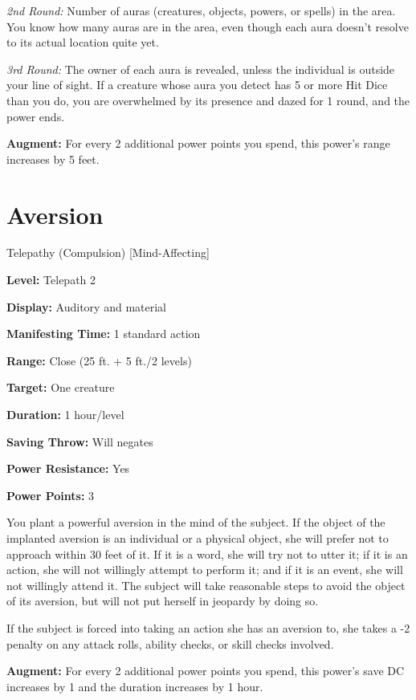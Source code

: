 \documentclass{article}
\begin{document}
\textit{2nd Round: }Number of auras (creatures, objects, powers, or spells) in 
the area. You know how many auras are in the area, even though each aura doesn't 
resolve to its actual location quite yet.

\textit{3rd Round: }The owner of each aura is revealed, unless the individual is 
outside your line of sight. If a creature whose aura you detect has 5 or more Hit 
Dice than you do, you are overwhelmed by its presence and dazed for 1 round, and 
the power ends.

\textbf{Augment:} For every 2 additional power points you spend, this power's range 
increases by 5 feet.

\vspace{12pt}
\section*{Aversion}

Telepathy (Compulsion) [Mind-Affecting]

\textbf{Level:} Telepath 2

\textbf{Display:} Auditory and material

\textbf{Manifesting Time:} 1 standard action

\textbf{Range:} Close (25 ft. + 5 ft./2 levels)

\textbf{Target:} One creature

\textbf{Duration:} 1 hour/level

\textbf{Saving Throw:} Will negates

\textbf{Power Resistance:} Yes

\textbf{Power Points:} 3

You plant a powerful aversion in the mind of the subject. If the object of the 
implanted aversion is an individual or a physical object, she will prefer not to 
approach within 30 feet of it. If it is a word, she will try not to utter it; if 
it is an action, she will not willingly attempt to perform it; and if it is an 
event, she will not willingly attend it. The subject will take reasonable steps 
to avoid the object of its aversion, but will not put herself in jeopardy by doing 
so.

If the subject is forced into taking an action she has an aversion to, she takes 
a -2 penalty on any attack rolls, ability checks, or skill checks involved.

\textbf{Augment:} For every 2 additional power points you spend, this power's save 
DC increases by 1 and the duration increases by 1 hour.
\end{document}
